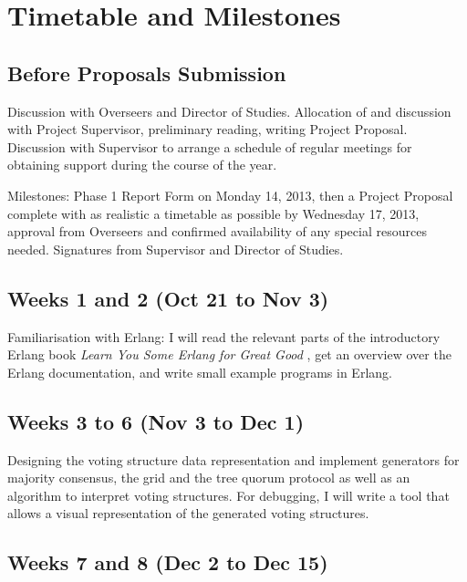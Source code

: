 \documentclass[12pt]{scrartcl}
\begin{document}
\section{Timetable and Milestones%
  \label{timetable-and-milestones}%
}


\subsection{Before Proposals Submission%
  \label{before-proposals-submission}%
}

Discussion with Overseers and Director of Studies. Allocation of and discussion with Project Supervisor, preliminary reading, writing Project Proposal. Discussion with Supervisor to arrange a schedule of regular meetings for obtaining support during the course of the year.

Milestones: Phase 1 Report Form on Monday 14, 2013, then a Project Proposal complete with as realistic a timetable as possible by Wednesday 17, 2013, approval from Overseers and confirmed availability of any special resources needed. Signatures from Supervisor and Director of Studies.


\subsection{Weeks 1 and 2 (Oct 21 to Nov 3)%
  \label{weeks-1-and-2-oct-21-to-nov-3}%
}

Familiarisation with Erlang: I will read the relevant parts of the introductory Erlang book \emph{Learn You Some Erlang for Great Good} \cite{lysefgg}, get an overview over the Erlang documentation, and write small example programs in Erlang.


\subsection{Weeks 3 to 6 (Nov 3 to Dec 1)%
  \label{weeks-3-to-6-nov-3-to-dec-1}%
}

Designing the voting structure data representation and implement generators for majority consensus, the grid and the tree quorum protocol as well as an algorithm to interpret voting structures. For debugging, I will write a tool that allows a visual representation of the generated voting structures.


\subsection{Weeks 7 and 8 (Dec 2 to Dec 15)%
  \label{weeks-7-and-8-dec-2-to-dec-15}%
}
\end{document}
